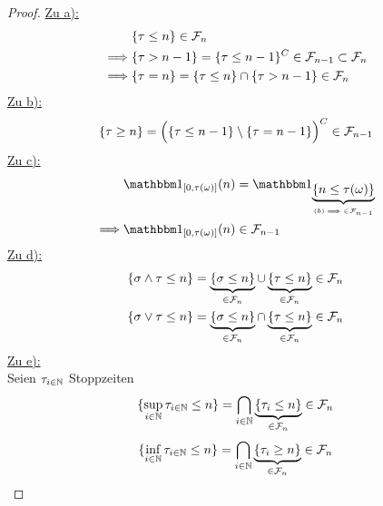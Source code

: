 \documentclass[12pt,a4paper]{article}
\begin{document}
\begin{proof}
\underline{Zu a):}\\
\begin{align*}
	&\{\tau \leq n\} \in \mathcal{F}_n \\
	\implies & \{\tau > n-1\} = \{\tau \leq n-1\}^C \in \mathcal{F}_{n-1} \subset \mathcal{F}_n \\
	\implies & \{\tau = n\} = \{\tau \leq n\} \cap \{\tau > n-1\} \in \mathcal{F}_n
	\end{align*}
\underline{Zu b):}\\
\begin{align*}
	\{\tau \geq n \} = \Big(\{\tau \leq n-1 \} \setminus \{\tau = n-1 \} \Big)^C \in \mathcal{F}_{n-1}
\end{align*}
\underline{Zu c):}\\
\begin{align*}
	&\indi_{[0,\tau(\omega)]}(n)=\indi_{\underbrace{\{n\leq \tau(\omega)\}}_{(b) \implies \in\F_{n-1}}} \\
	\implies &\indi_{[0,\tau(\omega)]}(n) \in \F_{n-1}
\end{align*}
\underline{Zu d):}\\
\begin{align*}
	&\{\sigma \wedge \tau \leq n \} = \underbrace{\{\sigma \leq n\}}_{\in \mathcal{F}_n} \cup \underbrace{\{\tau \leq n\}}_{\in\mathcal{F}_n} \in \mathcal{F}_n \\
	&\{\sigma \vee \tau \leq n \} = \underbrace{\{\sigma \leq n\}}_{\in \mathcal{F}_n} \cap \underbrace{\{\tau \leq n\}}_{\in\mathcal{F}_n} \in \mathcal{F}_n
\end{align*}
\underline{Zu e):}\\
Seien $\tau_{i\in\mathbb{N}}$ Stoppzeiten
\begin{align*}
	\{\sup_{i\in\mathbb{N}} \tau_{i\in\mathbb{N}} \leq n\} = \bigcap_{i\in\mathbb{N}}\underbrace{\{\tau_i \leq n\}}_{\in\mathcal{F}_n} \in \mathcal{F}_n
\end{align*}
\begin{align*}
	\{\inf_{i\in\mathbb{N}} \tau_{i\in\mathbb{N}} \leq n\} = \bigcap_{i\in\mathbb{N}}\underbrace{\{\tau_i \geq n\}}_{\in\mathcal{F}_n} \in \mathcal{F}_n
\end{align*}

\end{proof}
\end{document}
